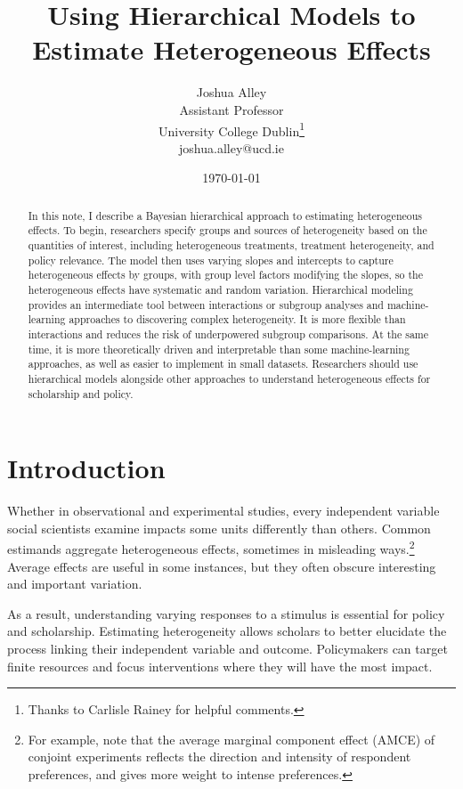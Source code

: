 \documentclass[12pt]{article}
\title{\textbf{Using Hierarchical Models to Estimate Heterogeneous Effects}}
\author{Joshua Alley \\
Assistant Professor \\
University College Dublin\thanks{Thanks to Carlisle Rainey for helpful comments.} \\
joshua.alley@ucd.ie
}
\date{\today}
\begin{document}
\maketitle 

\begin{abstract} 
In this note, I describe a Bayesian hierarchical approach to estimating heterogeneous effects. 
To begin, researchers specify groups and sources of heterogeneity based on the quantities of interest, including heterogeneous treatments, treatment heterogeneity, and policy relevance.  
The model then uses varying slopes and intercepts to capture heterogeneous effects by groups, with group level factors modifying the slopes, so the heterogeneous effects have systematic and random variation. 
Hierarchical modeling provides an intermediate tool between interactions or subgroup analyses and machine-learning approaches to discovering complex heterogeneity. 
It is more flexible than interactions and reduces the risk of underpowered subgroup comparisons.
At the same time, it is more theoretically driven and interpretable than some machine-learning approaches, as well as easier to implement in small datasets. 
Researchers should use hierarchical models alongside other approaches to understand heterogeneous effects for scholarship and policy.
\end{abstract} 


\newpage 
\doublespace 


\section{Introduction}


Whether in observational and experimental studies, every independent variable social scientists examine impacts some units differently than others. 
Common estimands aggregate heterogeneous effects, sometimes in misleading ways.\footnote{For example, \citet{Abramsonetal2022} note that the average marginal component effect (AMCE) of conjoint experiments reflects the direction and intensity of respondent preferences, and gives more weight to intense preferences.} 
Average effects are useful in some instances, but they often obscure interesting and important variation. 


As a result, understanding varying responses to a stimulus is essential for policy and scholarship. 
Estimating heterogeneity allows scholars to better elucidate the process linking their independent variable and outcome.
Policymakers can target finite resources and focus interventions where they will have the most impact. 
\end{document}
